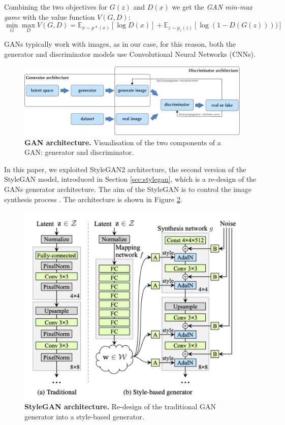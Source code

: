 \documentclass{article}
\begin{document}
	Combining the two objectives for $G(z)$ and $D(x)$ we get the \textit{GAN min-max game} with the 
	value function $V(G,D)$:
	\begin{equation}
		\label{e:minmaxgame}
		\min_G \max_D V(G,D) = 
		\mathbb{E}_{x \sim p*(x)} [\log D(x)] + \mathbb E _{z \sim p_z(z)} [\log (1-D(G(z))))]
	\end{equation}
	
	GANs typically work with images, as in our case, for this reason, both the generator and 
	discriminator models use Convolutional Neural Networks (CNNs).
	\begin{figure}[htb]				
		\centering
		\includegraphics[width=.65\linewidth]{images/GAN}
		\caption{\textbf{GAN architecture.} Visualisation of the two components of a GAN: generator and 
			discriminator.}
		\label{fig:gan}
	\end{figure}
	
	In this paper, we exploited StyleGAN2 architecture, the second version of the StyleGAN model, 
	introduced in Section \ref{sec:stylegan}, which is a re-design of the GANs generator architecture.
	The aim of the StyleGAN is to control the image synthesis process \cite{karras2019style}. The 
	architecture is shown in Figure \ref{fig:styleGAN}.
	\begin{figure}[!h]				
		\centering
		\includegraphics[width=.5\linewidth]{images/styleGAN}
		\caption{\textbf{StyleGAN architecture.} Re-design of the traditional GAN generator into a 
			style-based generator.}
		\label{fig:styleGAN}
	\end{figure}
	
\end{document}
